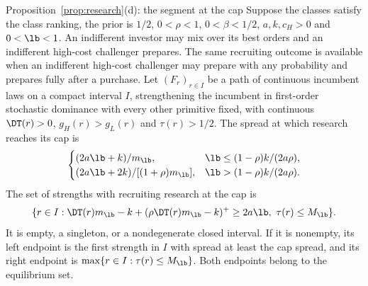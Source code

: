 \begin{named}{Proposition~\ref{prop:research}(d): the segment at the cap}
Suppose the classes satisfy the class ranking, the prior is \(1/2\), \(0<\rho<1\),
\(0<\beta<1/2\), \(a,k,c_H>0\) and \(0<\lb<1\). An indifferent investor may mix over its best orders and an
indifferent high-cost challenger prepares. The same recruiting outcome is available when an indifferent high-cost
challenger may prepare with any probability and prepares fully after a purchase.
Let \((F_r)_{r\in I}\) be a path of continuous incumbent laws on a compact interval \(I\), strengthening the
incumbent in first-order stochastic dominance with every other primitive fixed, with continuous
\(\DT(r)>0\), \(g_H(r)>g_L(r)\) and \(\tau(r)>1/2\). The spread at which research reaches its cap is
\[
\begin{cases}
(2a\lb+k)/m_{\lb},&\lb\le (1-\rho)k/(2a\rho),\\
(2a\lb+2k)/[(1+\rho)m_{\lb}],&\lb>(1-\rho)k/(2a\rho).
\end{cases}
\]
The set of strengths with recruiting research at the cap is
\[
\{r\in I:\DT(r)m_{\lb}-k+(\rho\DT(r)m_{\lb}-k)^+\ge2a\lb,\ \tau(r)\le M_{\lb}\}.
\]
It is empty, a singleton, or a nondegenerate closed interval. If it is nonempty, its left endpoint is
the first strength in \(I\) with spread at least the cap spread, and its right endpoint is
\(\max\{r\in I:\tau(r)\le M_{\lb}\}\). Both endpoints belong to the equilibrium set.
\end{named}

